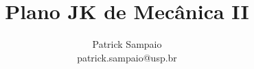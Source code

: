 \documentclass[columns=3, numbered theorems=false]{mycheatsheet}
\begin{document}
  \title{Plano JK de Mecânica II}
  \author{Patrick Sampaio\normalsize\\patrick.sampaio@usp.br} %
  \maketitle
  
    
  
  
  
  
  
  
  
  
  
\end{document}
